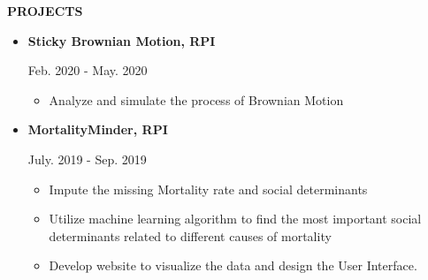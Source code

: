 \documentclass[]{article}
\newcommand{\rightAlign}{38em}
\begin{document}
 	\textbf{PROJECTS}
 	\begin{itemize}
 		
 			\item 
 		\begin{minipage}{\rightAlign}
 			\begin{flushleft}                           
 				\textbf{Sticky Brownian Motion, RPI} 
 			\end{flushleft} 
 		\end{minipage}
 		\begin{minipage}{15em}
 			Feb. 2020 - May. 2020
 		\end{minipage}
 		\begin{itemize}[itemsep=0ex,leftmargin=1cm,rightmargin=.16\textwidth]
 			\item Analyze  and simulate the process of Brownian Motion
 	
 		\end{itemize}
 		
 		
 		\item 
		\begin{minipage}{\rightAlign}
 			\begin{flushleft}                           
 				\textbf{MortalityMinder, RPI} 
 			\end{flushleft} 
 		\end{minipage}
 		\begin{minipage}{15em}
 			July. 2019 - Sep. 2019
 		\end{minipage}
 		\begin{itemize}[itemsep=0ex,leftmargin=1cm,rightmargin=.16\textwidth]
 			\item Impute the missing Mortality rate and social determinants
 			\item Utilize machine learning algorithm to find the most important social determinants related to different causes of mortality
			\item Develop website to visualize the data and design the User Interface.
 	\end{itemize}
		

\end{itemize}
\end{document}
